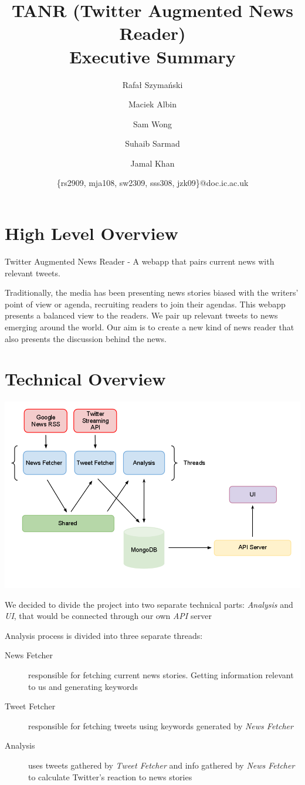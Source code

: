 \documentclass[a4paper,12pt]{article}
\title{TANR (Twitter Augmented News Reader)\\Executive Summary\\}
\author{
    \small{Rafał Szymański}\\
  	\and
    \small{Maciek Albin}\\
    \and
    \small{Sam Wong}\\
    \and  
    \small{Suhaib Sarmad}\\
		\and
		\small{Jamal Khan}\\
		\and
		\small{\{rs2909, mja108, sw2309, sss308, jzk09\}@doc.ic.ac.uk}
		\and
}
\date{}
\begin{document}
 
	\maketitle
	
  \section{High Level Overview}
  
  Twitter Augmented News Reader - A webapp that pairs current news with relevant tweets.
  
  Traditionally, the media has been presenting news stories biased with the writers’ point of view or agenda, recruiting readers to join their agendas. This webapp presents a balanced view to the readers. We pair up relevant tweets to news emerging around the world. Our aim is to create a new kind of news reader that also presents the discussion behind the news. 
  
  \section{Technical Overview}
  
	 \includegraphics[scale=0.2]{infrastructure.png}
	 
	 	We decided to divide the project into two separate technical parts: \emph{Analysis} and \emph{UI}, that would be connected through our own \emph{API} server
	 	
	 	Analysis process is divided into three separate threads:
  	\begin{description}
  	 \item[News Fetcher] responsible for fetching current news stories. Getting information relevant to us and generating keywords
  	 \item[Tweet Fetcher] responsible for fetching tweets using keywords generated by \emph{News Fetcher}
  	 \item[Analysis] uses tweets gathered by \emph{Tweet Fetcher} and info gathered by \emph{News Fetcher} to calculate Twitter's reaction to news stories
  	\end{description}
	 
\end{document}

